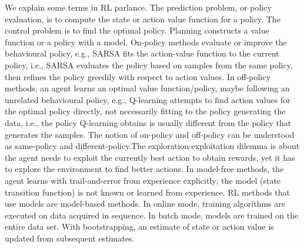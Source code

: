 We explain some terms in RL parlance. The prediction problem, or policy evaluation, is to compute the state or action value function for a policy. The control problem is to find the optimal policy. Planning constructs a value function or a policy with a model. On-policy methods evaluate or improve the behavioural policy, e.g., SARSA fits the action-value function to the current policy, i.e., SARSA evaluates the policy based on samples from the same policy, then refines the policy greedily with respect to action values. In off-policy methods, an agent learns an optimal value function/policy, maybe following an unrelated behavioural policy, e.g., Q-learning attempts to find action values for the optimal policy directly, not necessarily fitting to the policy generating the data, i.e., the policy Q-learning obtains is usually different from the policy that generates the samples.  The notion of on-policy and off-policy can be understood as same-policy and different-policy.The exploration-exploitation dilemma is about the agent needs to exploit the currently best action to obtain rewards, yet it has to explore the environment to find better actions.  In model-free methods, the agent learns with trail-and-error from experience explicitly; the model (state transition function) is not known or learned from experience. RL methods that use models are model-based methods. In online mode, training algorithms are executed on data acquired in sequence. In batch mode, models are trained on the entire data set. With bootstrapping, an estimate of state or action value is updated from subsequent estimates.
